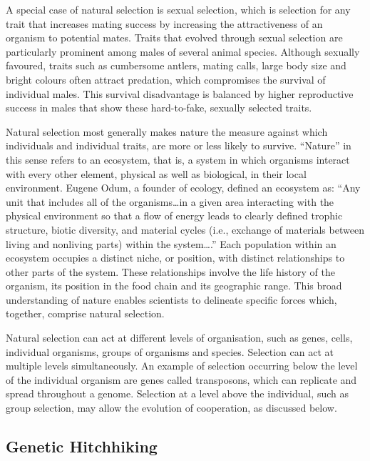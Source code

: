 A special case of natural selection is sexual selection, which is selection for any trait that increases mating success by increasing the attractiveness of an organism to potential mates. Traits that evolved through sexual selection are particularly prominent among males of several animal species. Although sexually favoured, traits such as cumbersome antlers, mating calls, large body size and bright colours often attract predation, which compromises the survival of individual males. This survival disadvantage is balanced by higher reproductive success in males that show these hard-to-fake, sexually selected traits.

Natural selection most generally makes nature the measure against which individuals and individual traits, are more or less likely to survive. ``Nature'' in this sense refers to an ecosystem, that is, a system in which organisms interact with every other element, physical as well as biological, in their local environment. Eugene Odum, a founder of ecology, defined an ecosystem as: ``Any unit that includes all of the organisms\ldots in a given area interacting with the physical environment so that a flow of energy leads to clearly defined trophic structure, biotic diversity, and material cycles (i.e., exchange of materials between living and nonliving parts) within the system\ldots.'' Each population within an ecosystem occupies a distinct niche, or position, with distinct relationships to other parts of the system. These relationships involve the life history of the organism, its position in the food chain and its geographic range. This broad understanding of nature enables scientists to delineate specific forces which, together, comprise natural selection.

Natural selection can act at different levels of organisation, such as genes, cells, individual organisms, groups of organisms and species. Selection can act at multiple levels simultaneously. An example of selection occurring below the level of the individual organism are genes called transposons, which can replicate and spread throughout a genome. Selection at a level above the individual, such as group selection, may allow the evolution of cooperation, as discussed below.

\hypertarget{genetic-hitchhiking}{%
\subsection{Genetic Hitchhiking}\label{genetic-hitchhiking}}

